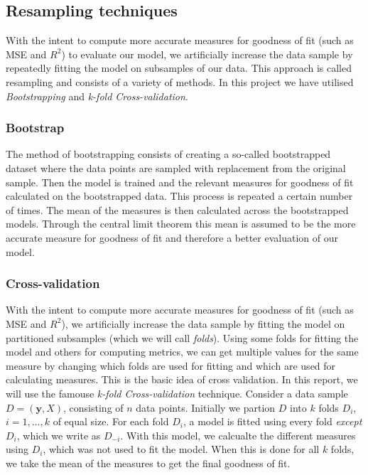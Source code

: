 \documentclass[twocolumn,english,notitlepage]{article}
\renewcommand{\vec}[1]{\boldsymbol{#1}}
\begin{document}
    \subsection{Resampling techniques}
    With the intent to compute more accurate measures for goodness of fit (such as MSE and $R^2$) to evaluate our model, we 
    artificially increase the data sample by repeatedly fitting the model on subsamples of our data. This approach is called resampling and consists of a variety of methods. In this project we have utilised \textit{Bootstrapping} and \textit{k-fold Cross-validation}. 

        \subsubsection*{Bootstrap}
        The method of bootstrapping consists of creating a so-called bootstrapped dataset where the data points are sampled with replacement from the original sample. Then the model is trained and the relevant measures for goodness of fit calculated on the bootstrapped data. This process is repeated a certain number of times. The mean of the measures is then calculated across the bootstrapped models. Through the central limit theorem this mean is assumed to be the more accurate measure for goodness of fit and therefore a better evaluation of our model.  

        \subsubsection*{Cross-validation}
        With the intent to compute more accurate measures for goodness of fit (such as MSE and $R^2$), we 
        artificially increase the data sample by fitting the model on partitioned subsamples (which we will call \textit{folds}). Using some folds
        for fitting the model and others for computing metrics, we can get multiple values for the same measure by changing which folds are used for fitting 
        and which are used for calculating measures. This is the basic idea of cross validation.
        \newline\newline
        In this report, we will use the famouse \textit{k-fold Cross-validation} technique. Consider a data sample $D = (\vec{y}, X)$, consisting of $n$ data points. Initially we partion $D$ into $k$ folds $D_i$, $i = 1, ... , k$ of equal size.   
        For each fold $D_i$, a model is fitted using every fold \textit{except} $D_i$, which we write as $D_{-i}$. With this model, we calcualte the different measures 
        using $D_i$, which was not used to fit the model. When this is done for all $k$ folds, we take the mean of the measures to get the 
        final goodness of fit. 
\end{document}
